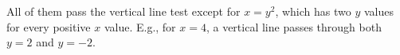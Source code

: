 All of them pass the vertical line test except for $x=y^2$,
which has two $y$ values for every positive $x$ value. E.g.,
for $x=4$, a vertical line passes through both $y=2$ and $y=-2$.
